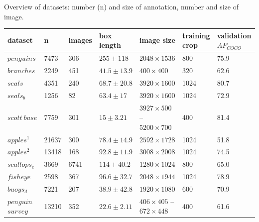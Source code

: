 \begin{threeparttable}[phtb]
\label{tab:resolutions}
\centering
\caption{Overview of datasets: number (n) and size of annotation, number and size of image.  } 
\begin{tabular}{lllllll}
dataset & n & images & box length & image size & \shortstack{training \\ crop} & \shortstack{validation \\ $AP_{COCO}$} \\
\toprule
$penguins$        & 7473        & 306    & $255 \pm 118$   &  $2048\times1536$  & 800                                   & 75.9                   \\
$branches$        & 2249        & 451    & $41.5 \pm 13.9$ &  $400\times400$    & 320                                   & 62.6                   \\
$seals$           & 4351        & 240    & $68.7 \pm 20.8$ &  $3920\times1600$  & 1024                                    & 80.7                   \\
$seals_b$         & 1256        & 82     & $63.4 \pm 17$   & $3920\times1600$  & 1024                                                     & 72.9        \\
$scott\:base$     & 7759        & 301    & $15 \pm 3.21$     & \shortstack[l]{$3927\times500$ -- \\ $5200\times700$} & 400  & 81.4  \\
$apples^1$        & 21637       & 300    & $78.4 \pm 14.9$ &  $2592\times1728$ & 1024 & 51.8                   \\
$apples^2$        & 13418       & 168    & $92.8 \pm 11.9$ &  $3008\times2008$  & 1024                                    & 74.5                   \\
$scallops_e$      & 3669        & 6741   & $114 \pm 40.2$  &  $1280\times1024$  & 800                                   & 65.0                   \\
$fisheye$         & 2598        & 367    & $96.6 \pm 32.7$ &  $2048\times1944$ & 1024                                     & 78.9                   \\
$buoys_d$         & 7221        & 207    & $38.9 \pm 42.8$ &  $1920\times1080$ & 600                                    & 70.9                   \\
\shortstack{$penguin$ \\ $survey$} & 13210       & 352    & $22.6 \pm 2.11$ & \shortstack[l] {$406\times405$ -- \\ $672\times448$} & 400  & 61.6               \\ 

\end{tabular}
\end{threeparttable}
